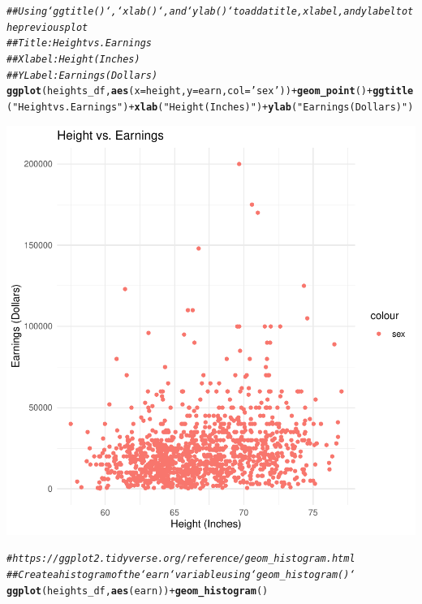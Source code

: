 \documentclass{article}\usepackage[]{graphicx}\usepackage[]{xcolor}
\makeatletter
\newcommand{\hlstr}[1]{\textcolor[rgb]{0.192,0.494,0.8}{#1}}%
\newcommand{\hlcom}[1]{\textcolor[rgb]{0.678,0.584,0.686}{\textit{#1}}}%
\newcommand{\hlopt}[1]{\textcolor[rgb]{0,0,0}{#1}}%
\newcommand{\hlstd}[1]{\textcolor[rgb]{0.345,0.345,0.345}{#1}}%
\newcommand{\hlkwc}[1]{\textcolor[rgb]{0.333,0.667,0.333}{#1}}%
\newcommand{\hlkwd}[1]{\textcolor[rgb]{0.737,0.353,0.396}{\textbf{#1}}}%
\newenvironment{kframe}{%
 \def\at@end@of@kframe{}%
 \ifinner\ifhmode%
  \def\at@end@of@kframe{\end{minipage}}%
  \begin{minipage}{\columnwidth}%
 \fi\fi%
 \def\FrameCommand##1{\hskip\@totalleftmargin \hskip-\fboxsep
 \colorbox{shadecolor}{##1}\hskip-\fboxsep
     \hskip-\linewidth \hskip-\@totalleftmargin \hskip\columnwidth}%
 \MakeFramed {\advance\hsize-\width
   \@totalleftmargin\z@ \linewidth\hsize
   \@setminipage}}%
 {\par\unskip\endMakeFramed%
 \at@end@of@kframe}
\newenvironment{knitrout}{}{} %
\makeatother
\begin{document}
\begin{knitrout}
{}


\begin{kframe}\begin{alltt}
\hlcom{## Using `ggtitle()`, `xlab()`, and `ylab()` to add a title, x label, and y label to the previous plot}
\hlcom{## Title: Height vs. Earnings}
\hlcom{## X label: Height (Inches)}
\hlcom{## Y Label: Earnings (Dollars)}
\hlkwd{ggplot}\hlstd{(heights_df,} \hlkwd{aes}\hlstd{(}\hlkwc{x}\hlstd{=height,} \hlkwc{y}\hlstd{=earn,} \hlkwc{col}\hlstd{=}\hlstr{'sex'}\hlstd{))} \hlopt{+} \hlkwd{geom_point}\hlstd{()} \hlopt{+} \hlkwd{ggtitle}\hlstd{(}\hlstr{"Height vs. Earnings"}\hlstd{)} \hlopt{+} \hlkwd{xlab}\hlstd{(}\hlstr{"Height (Inches)"}\hlstd{)} \hlopt{+} \hlkwd{ylab}\hlstd{(}\hlstr{"Earnings (Dollars)"}\hlstd{)}
\end{alltt}
\end{kframe}

{\centering \includegraphics[width=.6\linewidth]{figure/assignment-03-TangXin-Rnwauto-report-8} 

}


\begin{kframe}\begin{alltt}
\hlcom{# https://ggplot2.tidyverse.org/reference/geom_histogram.html}
\hlcom{## Create a histogram of the `earn` variable using `geom_histogram()`}
\hlkwd{ggplot}\hlstd{(heights_df,} \hlkwd{aes}\hlstd{(earn))} \hlopt{+} \hlkwd{geom_histogram}\hlstd{()}
\end{alltt}


{\ttfamily\noindent\itshape\color{messagecolor}{\#\# `stat\_bin()` using `bins = 30`. Pick better value with `binwidth`.}}\end{kframe}


\end{knitrout}
\end{document}
